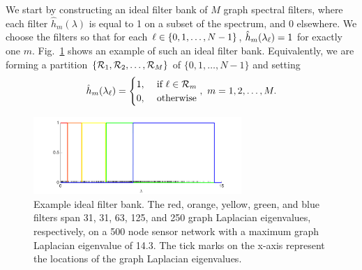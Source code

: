 \documentclass[journal, 10pt]{IEEEtran}
\begin{document}
We start by 
constructing an ideal filter bank of $M$ graph spectral filters, where each filter $\hat{h}_m(\lambda)$ is equal to 1 on a subset of the spectrum, and 0 elsewhere. We choose the filters so that for each $\ell \in \{0,1,\ldots,N-1\}$, $\hat{h}_m(\lambda_\ell)=1$ for exactly one $m$. Fig.\ \ref{Fig:fb} shows an example of such an ideal filter bank. Equivalently, we are forming a partition $\{{\cal R}_1,{\cal R}_2,\ldots,{\cal R}_M\}$ of $\{0,1,\ldots,N-1\}$ and setting 
$$
\hat{h}_m(\lambda_\l)=
\begin{cases}
1,&\hbox{ if } \l \in {\cal R}_m \\
0,&\hbox{ otherwise}
\end{cases},~m=1,2,\ldots,M.
$$
\begin{figure}[t]
\centerline{\includegraphics[width=3.1in]{fig_filter_bank}}
\caption{Example ideal filter bank. The red, orange, yellow, green, and blue filters span 31, 31, 63, 125, and 250 graph Laplacian eigenvalues, respectively, on a 500 node sensor network with %
a maximum graph Laplacian eigenvalue of 14.3. The tick marks on the x-axis represent the locations of the graph Laplacian eigenvalues.}\label{Fig:fb}
\end{figure}
\end{document}
